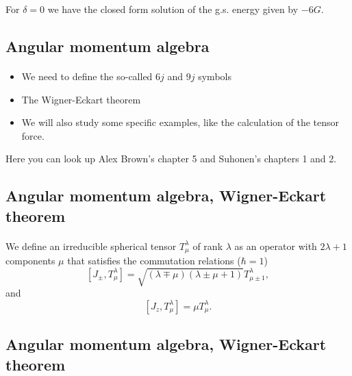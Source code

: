 \documentclass[%
twoside,                 %
final,                   %
10pt]{article}
\begin{document}
For $\delta = 0$ we have the closed form solution of  the g.s. energy given by $-6G$.





\subsection*{Angular momentum algebra}

\paragraph{}
\begin{itemize}
\item We need to define the so-called $6j$ and $9j$ symbols

\item The Wigner-Eckart theorem

\item We will also study  some specific examples, like the calculation of the tensor force.
\end{itemize}

\noindent
Here you can look up Alex Brown's chapter 5 and Suhonen's chapters 1 and 2.




\subsection*{Angular momentum algebra, Wigner-Eckart theorem}

\paragraph{}
We define an irreducible  spherical tensor $T^{\lambda}_{\mu}$ of rank $\lambda$ as an operator with $2\lambda+1$ components $\mu$ 
that satisfies the commutation relations ($\hbar=1$)
\[
[J_{\pm}, T^{\lambda}_{\mu}]= \sqrt{(\lambda\mp \mu)(\lambda\pm \mu+1)}T^{\lambda}_{\mu\pm 1},
\]
and
\[
[J_{z}, T^{\lambda}_{\mu}]=\mu T^{\lambda}_{\mu}.
\]




\subsection*{Angular momentum algebra, Wigner-Eckart theorem}
\end{document}
